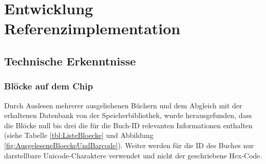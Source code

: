 \chapter{Entwicklung Referenzimplementation}

\section{Technische Erkenntnisse}

\subsection{Blöcke auf dem Chip}
Durch Auslesen mehrerer ausgeliehenen Büchern und dem Abgleich mit der erhaltenen Datenbank von der Speicherbibliothek, wurde herausgefunden, dass die Blöcke null bis drei die für die Buch-ID relevanten Informationen enthalten (siehe Tabelle \ref{tbl:ListeBloecke} und Abbildung \ref{fig:AusgeleseneBloeckeUndBarcode}). Weiter werden für die ID des Buches nur darstellbare Unicode-Charaktere verwendet und nicht der geschriebene Hex-Code.

